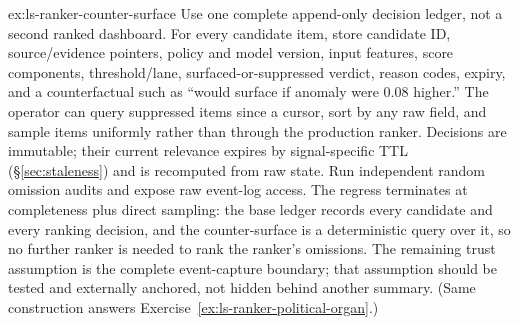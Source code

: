 \documentclass[11pt,a4paper]{article}
\theoremstyle{definition}
\theoremstyle{plain}
\begin{document}
\begin{pdsolution}{ex:ls-ranker-counter-surface}
Use one complete append-only decision ledger, not a second ranked dashboard. For every candidate item, store candidate ID, source/evidence pointers, policy and model version, input features, score components, threshold/lane, surfaced-or-suppressed verdict, reason codes, expiry, and a counterfactual such as ``would surface if anomaly were 0.08 higher.'' The operator can query suppressed items since a cursor, sort by any raw field, and sample items uniformly rather than through the production ranker. Decisions are immutable; their current relevance expires by signal-specific TTL (\S\ref{sec:staleness}) and is recomputed from raw state. Run independent random omission audits and expose raw event-log access. The regress terminates at completeness plus direct sampling: the base ledger records every candidate and every ranking decision, and the counter-surface is a deterministic query over it, so no further ranker is needed to rank the ranker's omissions. The remaining trust assumption is the complete event-capture boundary; that assumption should be tested and externally anchored, not hidden behind another summary. (Same construction answers Exercise~\ref{ex:ls-ranker-political-organ}.)
\end{pdsolution}

\end{document}

